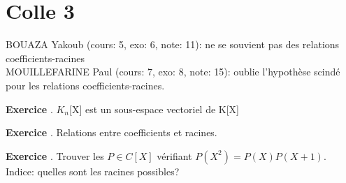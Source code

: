 \documentclass[10pt,a4paper]{article}
\newcounter{question}
\newcounter{exo}
\newenvironment{exo}{\vspace{0.5cm}\setcounter{question}{0}\addtocounter{exo}{1} \noindent \textbf{Exercice \theexo}. \normalsize }{\par}
\begin{document}
	\section*{Colle 3}
	\setcounter{exo}{0}
	BOUAZA Yakoub (cours: 5, exo: 6, note: 11): ne se souvient pas des relations coefficients-racines\\
	MOUILLEFARINE Paul (cours: 7, exo: 8, note: 15): oublie l'hypothèse scindé pour les relations coefficients-racines.\\
	
	\begin{exo}
		$K_n$[X] est un sous-espace vectoriel de K[X]
	\end{exo}		
	
	\begin{exo}
		Relations entre coefficients et racines.
	\end{exo}
		
	\begin{exo}
		Trouver les $P \in C[X]$ vérifiant
		$P (X^2 ) = P (X)P (X + 1)$.\\
		
		Indice: quelles sont les racines possibles?
	\end{exo}	
\end{document}
